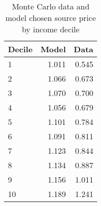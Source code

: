 \begin{table}[!ht]
	\centering
		\caption{Monte Carlo data and model chosen source price by income decile}
\begin{tabular}{lrr}
		\toprule
         Decile&     Model&      Data\\
		\midrule
		              1&     1.011&     0.545\\
		              2&     1.066&     0.673\\
		              3&     1.070&     0.700\\
		              4&     1.056&     0.679\\
		              5&     1.101&     0.784\\
		              6&     1.091&     0.811\\
		              7&     1.123&     0.844\\
		              8&     1.134&     0.887\\
		              9&     1.156&     1.011\\
		             10&     1.189&     1.241\\
		\bottomrule
	\end{tabular}
\end{table}
